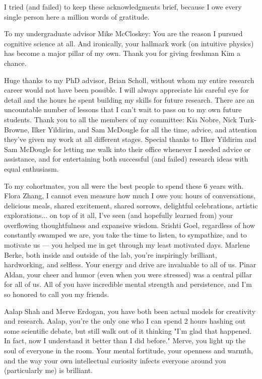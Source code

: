 
I tried (and failed) to keep these acknowledgments brief, because I owe every single person here a million words of gratitude.

To my undergraduate advisor Mike McCloskey: You are the reason I pursued cognitive science at all. And ironically, your hallmark work (on intuitive physics) has become a major pillar of my own. Thank you for giving freshman Kim a chance.

Huge thanks to my PhD advisor, Brian Scholl, without whom my entire research career would not have been possible. I will always appreciate his careful eye for detail and the hours he spent building my skills for future research.  There are an uncountable number of lessons that I can’t wait to pass on to my own future students. Thank you to all the members of my committee: Kia Nobre, Nick Turk-Browne, Ilker Yildirim, and Sam McDougle for all the time, advice, and attention they’ve given my work at all different stages. Special thanks to Ilker Yildirim and Sam McDougle for letting me walk into their office whenever I needed advice or assistance, and for entertaining both successful (and failed) research ideas with equal enthusiasm.

To my cohortmates, you all were the best people to spend these 6 years with.  Flora Zhang, I cannot even measure how much I owe you: hours of conversations, delicious meals, shared excitement, shared sorrows, delightful celebrations, artistic explorations... on top of it all, I've seen (and hopefully learned from) your overflowing thoughtfulness and expansive wisdom.  Srishti Goel, regardless of how constantly swamped we are, you take the time to listen, to sympathize, and to motivate us --- you helped me in get through my least motivated days. Marlene Berke, both inside and outside of the lab, you're inspiringly brilliant, hardworking, and selfless. Your energy and drive are invaluable to all of us. Pinar Aldan, your cheer and humor (even when you were stressed) was a central pillar for all of us. All of you have incredible mental strength and persistence, and I'm so honored to call you my friends.

Aalap Shah and Merve Erdogan, you have both been actual models for creativity and research.  Aalap, you're the only one who I can spend 2 hours hashing out some scientific debate, but still walk out of it thinking "I'm glad that happened. In fact, now I understand it better than I did before."  Merve, you light up the soul of everyone in the room.  Your mental fortitude, your openness and warmth, and the way your own intellectual curiosity infects everyone around you (particularly me) is brilliant. 

